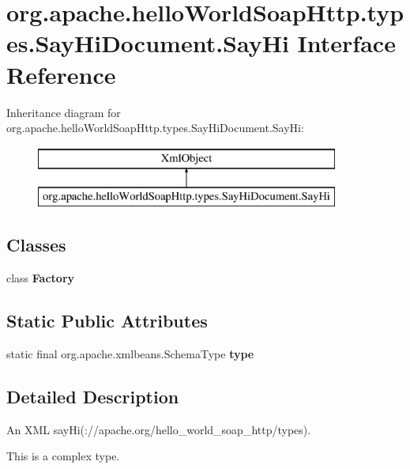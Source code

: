 \hypertarget{interfaceorg_1_1apache_1_1hello_world_soap_http_1_1types_1_1_say_hi_document_1_1_say_hi}{}\section{org.\+apache.\+hello\+World\+Soap\+Http.\+types.\+Say\+Hi\+Document.\+Say\+Hi Interface Reference}
\label{interfaceorg_1_1apache_1_1hello_world_soap_http_1_1types_1_1_say_hi_document_1_1_say_hi}
Inheritance diagram for org.\+apache.\+hello\+World\+Soap\+Http.\+types.\+Say\+Hi\+Document.\+Say\+Hi\+:\begin{figure}[H]
\begin{center}
\leavevmode
\includegraphics[height=2.000000cm]{interfaceorg_1_1apache_1_1hello_world_soap_http_1_1types_1_1_say_hi_document_1_1_say_hi}
\end{center}
\end{figure}
\subsection*{Classes}
\begin{DoxyCompactItemize}
\item 
class {\bfseries Factory}
\end{DoxyCompactItemize}
\subsection*{Static Public Attributes}
\begin{DoxyCompactItemize}
\item 
static final org.\+apache.\+xmlbeans.\+Schema\+Type {\bfseries type}
\end{DoxyCompactItemize}


\subsection{Detailed Description}
An X\+M\+L say\+Hi(\+://apache.org/hello\+\_\+world\+\_\+soap\+\_\+http/types).

This is a complex type. 

